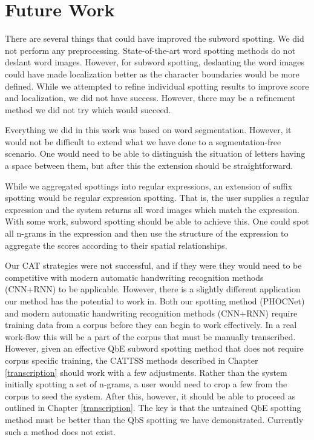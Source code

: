 \documentclass[ms,electronic,twosidetoc,letterpaper,chaptercenter,parttop,lof,lot]{byumsphd}
\begin{document}
\section{Future Work}



There are several things that could have improved the subword spotting. We did not perform any preprocessing. State-of-the-art word spotting methods do not deslant word images. However, for subword spotting, deslanting the word images could have made localization better as the character boundaries would be more defined. While we attempted to refine individual spotting results to improve score and localization, we did not have success. However, there may be a refinement method we did not try which would succeed.

Everything we did in this work was based on word segmentation. However, it would not be difficult to extend what we have done to a segmentation-free scenario. One would need to be able to distinguish the situation of letters having a space between them, but after this  the extension should be straightforward.

While we aggregated spottings into regular expressions, an extension of suffix spotting would be regular expression spotting. That is, the user supplies a regular expression and the system returns all word images which match the expression. With some work, subword spotting should be able to achieve this. One could spot all n-grams in the expression and then use the structure of the expression to aggregate the scores according to their spatial relationships.

Our CAT strategies were not successful, and if they were they would need to be competitive with modern automatic handwriting recognition methods (CNN+RNN) to be applicable. However, there is a slightly different application our method has the potential to work in.
Both our spotting method (PHOCNet) and modern automatic handwriting recognition methods (CNN+RNN) require training data from a corpus before they can begin to work effectively. In a real work-flow this will be a part of the corpus that must be manually transcribed. However, given an effective QbE subword spotting method that does not require corpus specific training, the CATTSS methods described in Chapter \ref{transcription} should work with a few adjustments. Rather than the system initially spotting a set of n-grams, a user would need to crop a few from the corpus to seed the system. After this, however, it should be able to proceed as outlined in Chapter \ref{transcription}.
The key is that the untrained QbE spotting method must be better than the QbS spotting we have demonstrated. Currently such a method does not exist.
\end{document}
